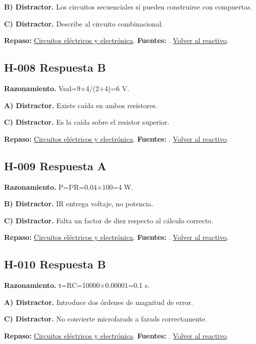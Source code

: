 \textbf{B) Distractor. }Los circuitos secuenciales sí pueden construirse con compuertas.

\textbf{C) Distractor. }Describe al circuito combinacional.

\textbf{Repaso:} \hyperref[sec:h1]{Circuitos eléctricos y electrónica}. \textbf{Fuentes:} \cite{openstax,electronics,digital}. \hyperref[q:H-007]{Volver al reactivo}.\par\medskip

\subsection*{H-008 \quad Respuesta B}\label{s:H-008}
\textbf{Razonamiento.} Vsal=9×4/(2+4)=6 V.

\textbf{A) Distractor. }Existe caída en ambos resistores.

\textbf{C) Distractor. }Es la caída sobre el resistor superior.

\textbf{Repaso:} \hyperref[sec:h1]{Circuitos eléctricos y electrónica}. \textbf{Fuentes:} \cite{openstax,electronics,digital}. \hyperref[q:H-008]{Volver al reactivo}.\par\medskip

\subsection*{H-009 \quad Respuesta A}\label{s:H-009}
\textbf{Razonamiento.} P=I²R=0.04×100=4 W.

\textbf{B) Distractor. }IR entrega voltaje, no potencia.

\textbf{C) Distractor. }Falta un factor de diez respecto al cálculo correcto.

\textbf{Repaso:} \hyperref[sec:h1]{Circuitos eléctricos y electrónica}. \textbf{Fuentes:} \cite{openstax,electronics,digital}. \hyperref[q:H-009]{Volver al reactivo}.\par\medskip

\subsection*{H-010 \quad Respuesta B}\label{s:H-010}
\textbf{Razonamiento.} τ=RC=10000×0.00001=0.1 s.

\textbf{A) Distractor. }Introduce dos órdenes de magnitud de error.

\textbf{C) Distractor. }No convierte microfarads a farads correctamente.

\textbf{Repaso:} \hyperref[sec:h1]{Circuitos eléctricos y electrónica}. \textbf{Fuentes:} \cite{openstax,electronics,digital}. \hyperref[q:H-010]{Volver al reactivo}.\par\medskip

